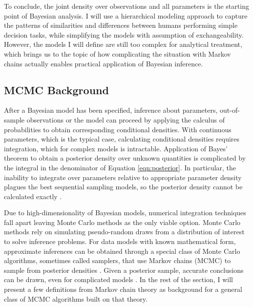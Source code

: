 \documentclass[12pt]{report}
\begin{document}
To conclude, the joint density over observations and all parameters is the starting point of Bayesian analysis. I will use a hierarchical modeling approach to capture the patterns of similarities and differences between humans performing simple decision tasks, while simplifying the models with assumption of exchangeability. However, the models I will define are still too complex for analytical treatment, which brings us to the topic of how complicating the situation with Markov chains actually enables practical application of Bayesian inference.


\subsection{MCMC Background}

After a Bayesian model has been specified, inference about
parameters, out-of-sample observations or the model can proceed by applying the calculus of
probabilities to obtain corresponding conditional densities. With continuous parameters, which is the typical case, calculating conditional densities requires integration, which for complex models is intractable. Application of Bayes' theorem to obtain a posterior density over unknown quantities is
complicated by the integral in the denominator of
Equation \ref{eqn:posterior}. In particular, the inability to integrate over parameters relative to appropriate parameter density plagues the best sequential sampling models, so the
posterior density cannot be calculated exactly \citep{RouLu2005,VanTue2011}. 

Due to high-dimensionality of Bayesian models, numerical integration techniques fall apart leaving Monte Carlo methods as the only viable option. Monte Carlo methods rely on simulating pseudo-random draws from a distribution of interest to solve inference problems. For data models with known mathematical form, approximate inferences can be obtained through a 
special class of Monte Carlo algorithms, sometimes called samplers, that use Markov chains (MCMC) to sample from posterior densities
\citep{RobCas2004,GamLop2006,GivHoe2012,GelCar2013}. Given a posterior sample, accurate conclusions can be drawn, even for complicated models
\citep{PerVan2002,CraPer2010,VanTue2011}. In the rest of the section, I will present a few definitions from Markov chain theory as background for a general class of MCMC algorithms built on that theory.
\end{document}
